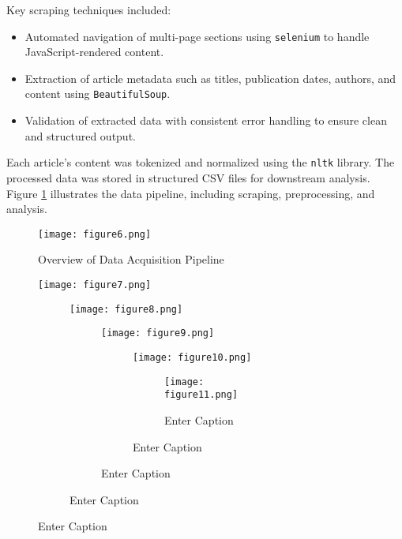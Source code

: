 \documentclass{article}
\begin{document}
Key scraping techniques included:
\begin{itemize}
    \item Automated navigation of multi-page sections using \texttt{selenium} to handle JavaScript-rendered content.
    \item Extraction of article metadata such as titles, publication dates, authors, and content using \texttt{BeautifulSoup}.
    \item Validation of extracted data with consistent error handling to ensure clean and structured output.
\end{itemize}

Each article’s content was tokenized and normalized using the \texttt{nltk} library. The processed data was stored in structured CSV files for downstream analysis. Figure \ref{fig6} illustrates the data pipeline, including scraping, preprocessing, and analysis.

\begin{figure}[H]
    \centering
    \texttt{[image: figure6.png]}
    \caption{Overview of Data Acquisition Pipeline}
    \label{fig6}
\end{figure}
\begin{figure}
    \centering
    \texttt{[image: figure7.png]}
    \caption{Enter Caption}
\begin{figure}
        \centering
        \texttt{[image: figure8.png]}
        \caption{Enter Caption}
\begin{figure}
            \centering
            \texttt{[image: figure9.png]}
            \caption{Enter Caption}
\begin{figure}
                \centering
                \texttt{[image: figure10.png]}
                \caption{Enter Caption}
\begin{figure}
                    \centering
                    \texttt{[image: figure11.png]}
                    \caption{Enter Caption}
                    \label{fig:enter-label}
                \end{figure}
                                \label{fig:enter-label}
            \end{figure}
                        \label{fig:enter-label}
        \end{figure}
                \label{fig:enter-label}
    \end{figure}
        \label{fig:enter-label}
\end{figure}
\end{document}
